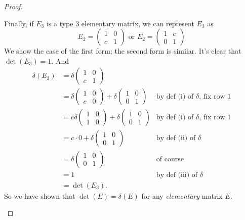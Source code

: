 \begin{proof}
\begin{enumerate}
Finally, if \(E_3\) is a type 3 elementary matrix, we can represent \(E_3\) as
\[
    E_2 = \begin{pmatrix} 1 & 0 \\ c & 1
    \end{pmatrix}
    \text{ or }
    E_2 = \begin{pmatrix} 1 & c \\ 0 & 1
    \end{pmatrix}
\]
We show the case of the first form; the second form is similar.
It's clear that \(\det(E_3) = 1\).
And
\begin{align*}
    \delta(E_3) & = \delta \begin{pmatrix} 1 & 0 \\ c & 1 \end{pmatrix} \\
                & = \delta \begin{pmatrix} 1 & 0 \\ c & 0 \end{pmatrix} + \delta \begin{pmatrix} 1 & 0 \\ 0 & 1 \end{pmatrix} & \text{by def (i) of \(\delta\), fix row \(1\)} \\
                & = c \delta \begin{pmatrix} 1 & 0 \\ 1 & 0 \end{pmatrix} + \delta \begin{pmatrix} 1 & 0 \\ 0 & 1 \end{pmatrix} & \text{by def (i) of \(\delta\), fix row \(1\)} \\
                & = c \cdot 0 + \delta \begin{pmatrix} 1 & 0 \\ 0 & 1 \end{pmatrix} & \text{by def (ii) of \(\delta\)} \\
                & = \delta \begin{pmatrix} 1 & 0 \\ 0 & 1 \end{pmatrix} & \text{of course} \\
                & = 1 & \text{by def (iii) of \(\delta\)} \\
                & = \det(E_3).
\end{align*}
So we have shown that \(\det(E) = \delta(E)\) for any \emph{elementary} matrix \(E\).


\end{enumerate}
\end{proof}
